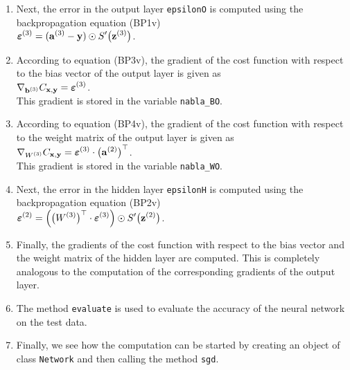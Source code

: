 \begin{enumerate}
      These four steps constitute the forward pass of backpropagation.
\item Next, the error in the output layer \texttt{epsilonO} is computed using the backpropagation equation
      (BP1v)
      \\[0.2cm]
      \hspace*{1.3cm}
      $\displaystyle \boldsymbol{\varepsilon}^{(3)} = (\mathbf{a}^{(3)} - \mathbf{y}) \odot S'\bigl(\mathbf{z}^{(3)}\bigr)$.
\item According to  equation (BP3v), the gradient of the cost function with respect to the bias vector of the
      output layer is given as
      \\[0.2cm]
      \hspace*{1.3cm}
      $\displaystyle \nabla_{\mathbf{b}^{(3)}} C_{\mathbf{x}, \mathbf{y}} = \boldsymbol{\varepsilon}^{(3)}$.
      \\[0.2cm]
      This gradient is stored in the variable \texttt{nabla\_BO}.
\item According to equation (BP4v), the gradient  of the cost function with respect to the weight matrix of the
      output layer is given as
      \\[0.2cm]
      \hspace*{1.3cm}
      $\displaystyle \nabla_{W^{(3)}} C_{\mathbf{x}, \mathbf{y}} = \boldsymbol{\varepsilon}^{(3)} \cdot \bigl(\mathbf{a}^{(2)}\bigr)^\top$.
      \\[0.2cm]
      This gradient is stored in the variable \texttt{nabla\_WO}.
\item Next, the error in the hidden layer \texttt{epsilonH} is computed using the backpropagation equation
      (BP2v)
      \\[0.2cm]
      \hspace*{1.3cm}
      $\displaystyle \boldsymbol{\varepsilon}^{(2)} = \Bigl(\bigl(W^{(3)}\bigr)^\top \cdot \boldsymbol{\varepsilon}^{(3)}\Bigr) \odot
           S'\bigl(\mathbf{z}^{(2)}\bigr)
      $.
\item Finally, the gradients of the cost function with respect to the bias
      vector and the weight matrix of the hidden layer are computed.  This is completely analogous to the computation of
      the corresponding gradients of the output layer.
\item The method \texttt{evaluate} is used to evaluate the accuracy of the neural network on the test data.
\item Finally, we see how the computation can be started by creating an object of class \texttt{Network} and
      then calling the method \texttt{sgd}.
\end{enumerate}
